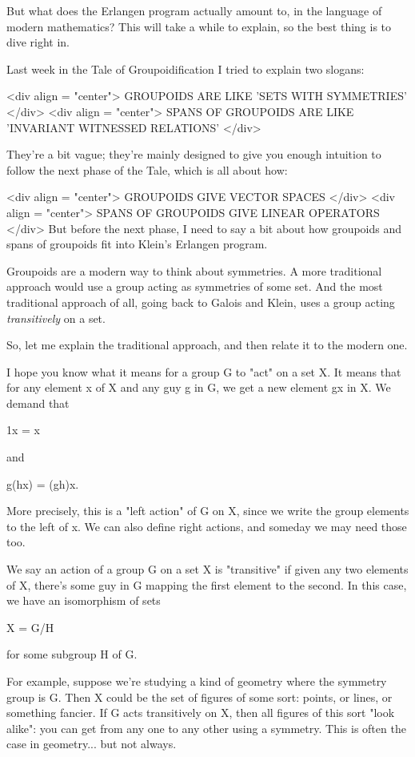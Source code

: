 But what does the Erlangen program actually amount to, in the language
of modern mathematics?  This will take a while to explain, so the best 
thing is to dive right in.  

Last week in the Tale of Groupoidification I tried to explain two slogans:

<div align = "center">
                  GROUPOIDS ARE LIKE 'SETS WITH SYMMETRIES'
</div>
<div align = "center">
          SPANS OF GROUPOIDS ARE LIKE 'INVARIANT WITNESSED RELATIONS'
</div>

They're a bit vague; they're mainly designed to give you enough intuition
to follow the next phase of the Tale, which is all about how:

<div align = "center">
                   GROUPOIDS GIVE VECTOR SPACES
</div>
<div align = "center">
              SPANS OF GROUPOIDS GIVE LINEAR OPERATORS
</div>
But before the next phase, I need to say a bit about how groupoids
and spans of groupoids fit into Klein's Erlangen program.

Groupoids are a modern way to think about symmetries.   A more 
traditional approach would use a group acting as symmetries of
some set.  And the most traditional approach of all, going back to
Galois and Klein, uses a group acting \emph{transitively} on a set.  

So, let me explain the traditional approach, and then relate it
to the modern one.

I hope you know what it means for a group G to "act" on a set X. 
It means that for any element x of X and any guy g in G, we get a 
new element gx in X.  We demand that 

1x = x

and 

g(hx) = (gh)x.

More precisely, this is a "left action" of G on X, since we write
the group elements to the left of x.  We can also define right actions,
and someday we may need those too.

We say an action of a group G on a set X is "transitive" if given 
any two elements of X, there's some guy in G mapping the first 
element to the second.  In this case, we have an isomorphism of sets

X = G/H

for some subgroup H of G.

For example, suppose we're studying a kind of geometry where the symmetry
group is G.  Then X could be the set of figures of some sort: points, or 
lines, or something fancier.  If G acts transitively on X, then all
figures of this sort "look alike": you can get from any one to any other 
using a symmetry.  This is often the case in geometry... but not always.  

